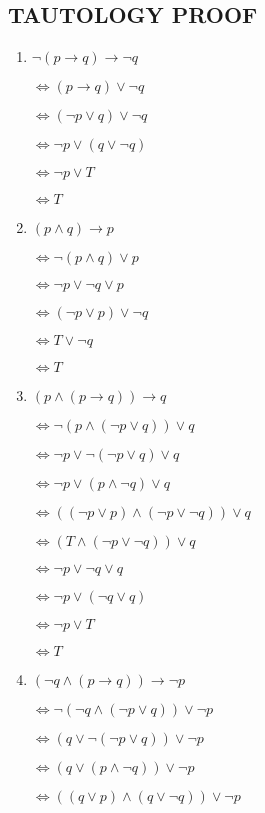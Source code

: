 \documentclass{../../cls/sig-alternate-05-2015}
\begin{document}
\subsection{TAUTOLOGY PROOF}
\begin{enumerate}
\item $\neg (p \rightarrow q) \rightarrow \neg q$

$\Leftrightarrow  (p \rightarrow q) \lor \neg q$

$\Leftrightarrow  (\neg p \lor q) \lor \neg q$

$\Leftrightarrow  \neg p \lor (q \lor \neg q)$

$\Leftrightarrow  \neg p \lor T$

$\Leftrightarrow   T$
    
\item $(p\land q)\rightarrow p$

$\Leftrightarrow \neg (p\land q)\lor p$

$\Leftrightarrow \neg p\lor \neg q \lor p$

$\Leftrightarrow (\neg p\lor p )\lor \neg q $

$\Leftrightarrow T\lor \neg q $

$\Leftrightarrow T $
\item $(p\land (p\rightarrow q))\rightarrow q$

$\Leftrightarrow \neg (p\land (\neg p\lor q))\lor q$

$\Leftrightarrow \neg p\lor \neg(\neg p\lor q)\lor q$

$\Leftrightarrow \neg p\lor (p\land \neg q)\lor q$

$\Leftrightarrow ((\neg p\lor p)\land (\neg p \lor \neg q))\lor q$

$\Leftrightarrow (T\land (\neg p \lor \neg q))\lor q$

$\Leftrightarrow \neg p \lor \neg q \lor q$

$\Leftrightarrow \neg p \lor (\neg q \lor q)$

$\Leftrightarrow \neg p \lor T$

$\Leftrightarrow T $
\item $(\neg q \land (p \rightarrow q))\rightarrow \neg p$

$\Leftrightarrow  \neg (\neg q \land (\neg p \lor q))\lor \neg p$

$\Leftrightarrow   ( q \lor \neg(\neg p \lor q))\lor \neg p$

$\Leftrightarrow   ( q \lor  (p \land \neg q))\lor \neg p$

$\Leftrightarrow   (( q \lor p) \land (q\lor \neg q))\lor \neg p$


\end{enumerate}
\end{document}
